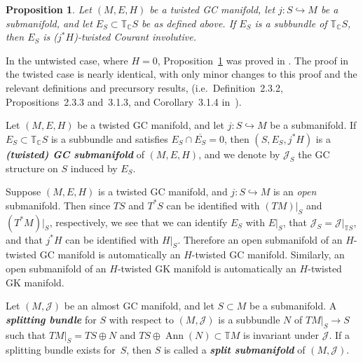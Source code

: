 \documentclass[pdftex]{sigma}
\newtheorem{Proposition}[Theorem]{Proposition}
\numberwithin{equation}{section}
\newcommand{\deff}[1]{\textbf{\emph{#1}}}
\newcommand{\hookfunc}[3]{#1 \colon #2 \hookrightarrow #3}
\newcommand{\pont}[1]{\mathbb{T} {#1}}
\newcommand{\cpont}[1]{\mathbb{T}_{\mathbb{C}} {#1}}
\newcommand{\tang}{T}
\begin{document}
\begin{Proposition} \label{prop6}
Let $(M,E,H)$ be a twisted GC manifold, let $\hookfunc{j}{S}{M}$ be a submanifold, and let $E_S \subset \cpont{S}$ be as defined above.  If $E_S$ is a subbundle of $\cpont{S}$, then $E_S$ is ($j^*H$)-twisted Courant involutive.
\end{Proposition}


In the untwisted case, where $H = 0$, Proposition~\ref{prop6} was proved in \cite[Corollary 3.1.4]{courant}.  The proof in the twisted case is nearly identical, with only minor changes to this proof and the relevant def\/initions and precursory results, (i.e.\ Def\/inition~2.3.2, Propositions~2.3.3 and~3.1.3, and Corollary~3.1.4 in~\cite{courant}).


\begin{Definition}
Let $(M,E,H)$ be a twisted GC manifold, and let $\hookfunc{j}{S}{M}$ be a submanifold.  If $E_S \subset \cpont{S}$ is a subbundle and satisf\/ies $E_S \cap \overline{E_S} = 0$, then $(S,E_S,j^* H)$ is a \deff{(twisted) GC submanifold} of $(M,E,H)$, and we denote by $\mathcal{J}_S$ the GC structure on $S$ induced by $E_S$.
\end{Definition}


\begin{Remark} \label{rem2}
Suppose $(M,E,H)$ is a twisted GC manifold, and $\hookfunc{j}{S}{M}$ is an \emph{open} submanifold.  Then since $\tang S$ and $\tang^* S$ can be identif\/ied with $(\tang M)|_S$ and $(\tang^* M)|_S$, respectively, we see that we can identify $E_S$ with $E|_S$, that $\mathcal{J}_S = \mathcal{J}|_{\pont{S}}$, and that $j^* H$ can be identif\/ied with $H|_S$.  Therefore an open submanifold of an $H$-twisted GC manifold is automatically an $H$-twisted GC manifold.  Similarly, an open submanifold of an $H$-twisted GK manifold is automatically an $H$-twisted GK manifold.
\end{Remark}


\begin{Definition}
Let $(M, \mathcal{J})$ be an almost GC manifold, and let $S \subset M$ be a submanifold.  A \deff{splitting bundle} for $S$ with respect to $(M, \mathcal{J})$ is a subbundle $N$ of $\tang M|_S \to S$ such that $\tang M|_S = \tang S \oplus N$ and $\tang S \oplus \operatorname{Ann} (N) \subset \pont{M}$ is invariant under $\mathcal{J}$. If a splitting bundle exists for~$S$, then $S$ is called a \deff{split submanifold} of $(M,\mathcal{J})$.
\end{Definition}
\end{document}
